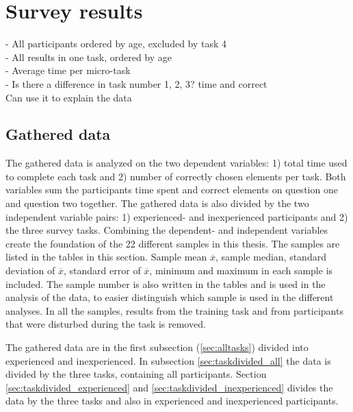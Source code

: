 \section{Survey results}\label{sec:survey_results}

- All participants ordered by age, excluded by task 4 \\
- All results in one task, ordered by age \\ 
- Average time per micro-task \\
- Is there a difference in task number 1, 2, 3? time and correct  \\
Can use it to explain the data

\subsection{Gathered data}\label{sec:gathereddata}
The gathered data is analyzed on the two dependent variables: 1) total time used to complete each task and 2) number of correctly chosen elements per task. Both variables sum the participants time spent and correct elements on question one and question two together. The gathered data is also divided by the two independent variable pairs: 1) experienced- and inexperienced participants and 2) the three survey tasks. Combining the dependent- and independent variables create the foundation of the 22 different samples in this thesis. The samples are listed in the tables in this section. Sample mean $\overline{x}$, sample median, standard deviation of $\overline{x}$, standard error of $\overline{x}$, minimum and maximum in each sample is included. The sample number is also written in the tables and is used in the analysis of the data, to easier distinguish which sample is used in the different analyses. In all the samples, results from the training task and from participants that were disturbed during the task is removed.

The gathered data are in the first subsection (\ref{sec:alltasks}) divided into experienced and inexperienced. In subsection \ref{sec:taskdivided_all} the data is divided by the three tasks, containing all participants. Section \ref{sec:taskdivided_experienced}  and \ref{sec:taskdivided_inexperienced} divides the data by the three tasks and also in experienced and inexperienced participants. 

